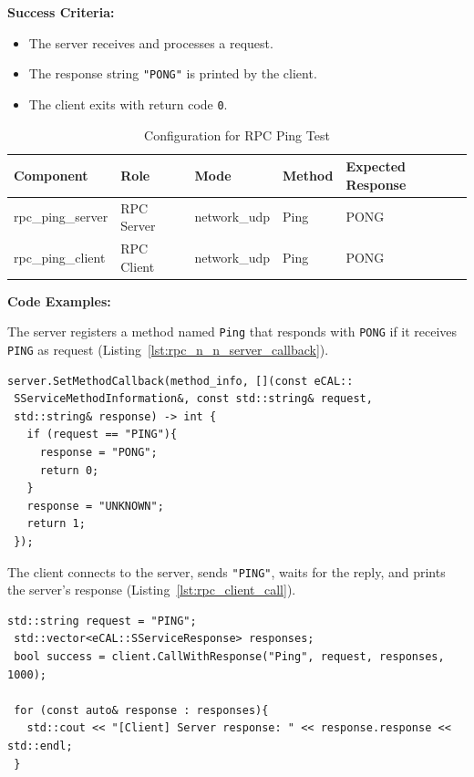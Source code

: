 \textbf{Success Criteria:}
\begin{itemize}
	\item The server receives and processes a request.
	\item The response string \texttt{"PONG"} is printed by the client.
	\item The client exits with return code \texttt{0}.
\end{itemize}

\begin{table}[H]
	\centering
	\begin{tabular}{@{}lllll@{}}
		\toprule
		\textbf{Component} & \textbf{Role} & \textbf{Mode} & \textbf{Method} & \textbf{Expected Response} \\
		\midrule
		rpc\_ping\_server  & RPC Server   & network\_udp & Ping & PONG \\
		rpc\_ping\_client  & RPC Client   & network\_udp & Ping & PONG \\
		\bottomrule
	\end{tabular}
	\caption{Configuration for RPC Ping Test}
	\label{tab:rpc_ping_test}
\end{table}


\textbf{Code Examples:}

\vspace{0.4em}
The server registers a method named \texttt{Ping} that responds with \texttt{PONG} if it receives \texttt{PING} as request (Listing~\ref{lst:rpc_n_n_server_callback}).

\begin{lstlisting}[style=cppstyle, caption={RPC Server handler for method "Ping"}, label={lst:rpc_n_n_server_callback}, captionpos=b]
 server.SetMethodCallback(method_info, [](const eCAL::
 SServiceMethodInformation&, const std::string& request,
 std::string& response) -> int {
   if (request == "PING"){
     response = "PONG";
     return 0;
   }
   response = "UNKNOWN";
   return 1;
 });
\end{lstlisting}

The client connects to the server, sends \texttt{"PING"}, waits for the reply, and prints the server’s response (Listing~\ref{lst:rpc_client_call}).

\begin{lstlisting}[style=cppstyle, caption={RPC Client sends Ping request and prints response}, label={lst:rpc_client_call}, captionpos=b]
 std::string request = "PING";
 std::vector<eCAL::SServiceResponse> responses;
 bool success = client.CallWithResponse("Ping", request, responses, 1000);
	
 for (const auto& response : responses){
   std::cout << "[Client] Server response: " << response.response << std::endl;
 }
\end{lstlisting}

